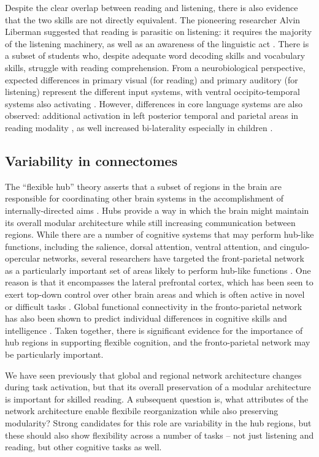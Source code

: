 Despite the clear overlap between reading and listening, there is also evidence that the two skills are not directly equivalent. The pioneering researcher Alvin Liberman suggested that reading is parasitic on listening: it requires the majority of the listening machinery, as well as an awareness of the linguistic act \citep{Mattingly1972}. There is a subset of students who, despite adequate word decoding skills and vocabulary skills, struggle with reading comprehension\citep{Pimperton2010, Spencer2014}. From a neurobiological perspective, expected differences in primary visual (for reading) and primary auditory (for listening) represent the different input systems, with ventral occipito-temporal systems also activating \citep{Jobard2007}. However, differences in core language systems are also observed: additional activation in left posterior temporal and parietal areas in reading modality \citep{Constable2004}, as well increased bi-laterality especially in children \citep{Berl2011}. 

\subsection{Variability in connectomes}

The ``flexible hub'' theory asserts that a subset of regions in the brain are responsible for coordinating other brain systems in the accomplishment of internally-directed aims \citep{Cole2007}. Hubs provide a way in which the brain might maintain its overall modular architecture while still increasing communication between regions. While there are a number of cognitive systems that may perform hub-like functions, including the salience, dorsal attention, ventral attention, and cingulo-opercular networks, several researchers have targeted the front-parietal network as a particularly important set of areas likely to perform hub-like functions \citep{Cole2013, Niendam2012}. One reason is that it encompasses the lateral prefrontal cortex, which has been seen to exert top-down control over other brain areas and which is often active in novel or difficult tasks \citep{Duncan2010}. Global functional connectivity in the fronto-parietal network has also been shown to predict individual differences in cognitive skills and intelligence \citep{Cole2012}. Taken together, there is significant evidence for the importance of hub regions in supporting flexible cognition, and the fronto-parietal network may be particularly important. 

We have seen previously that global and regional network architecture changes during task activation, but that its overall preservation of a modular architecture is important for skilled reading. A subsequent question is, what attributes of the network architecture enable flexibile reorganization while also preserving modularity? Strong candidates for this role are variability in the hub regions, but these should also show flexibility across a number of tasks -- not just listening and reading, but other cognitive tasks as well. 

